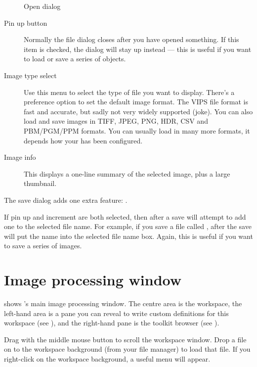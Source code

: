 \begin{figure}
\caption{Open dialog}
\end{figure}

\begin{description}

\item[Pin up button]
Normally the file dialog closes after you have opened something.
If this item is checked, the dialog will stay up instead --- this is useful
if you want to load or save a series of objects.

\item[Image type select]
Use this menu to select the type of file you want \nip{} to display.
There's a preference option to set the default image format.  The VIPS
file format is fast and accurate, but sadly not very widely supported
(joke). You can also load and save images in TIFF, JPEG, PNG, HDR, CSV and
PBM/PGM/PPM formats. You can usually load in many more formats, it depends
how your \nip{} has been configured.

\item[Image info]
This displays a one-line summary of the selected image, plus a large
thumbnail. 

\end{description}

The save dialog adds one extra feature: .

If pin up and increment are both selected, then after a save \nip{} will
attempt to add one to the selected file name. For example, if you save a file
called , after the save \nip{} will put the name 
into the selected file name box. Again, this is useful if you want to save
a series of images.

\section{Image processing window}

 shows \nip{}'s main image processing window. The centre
area is the workspace, the left-hand area is a pane you can reveal to write
custom definitions for this workspace (see ), and the right-hand pane is the toolkit browser (see
).

Drag with the middle mouse button to scroll the workspace window. Drop a file
on to the workspace background (from your file manager) to load that file.
If you right-click on the workspace background, a useful menu will appear.

